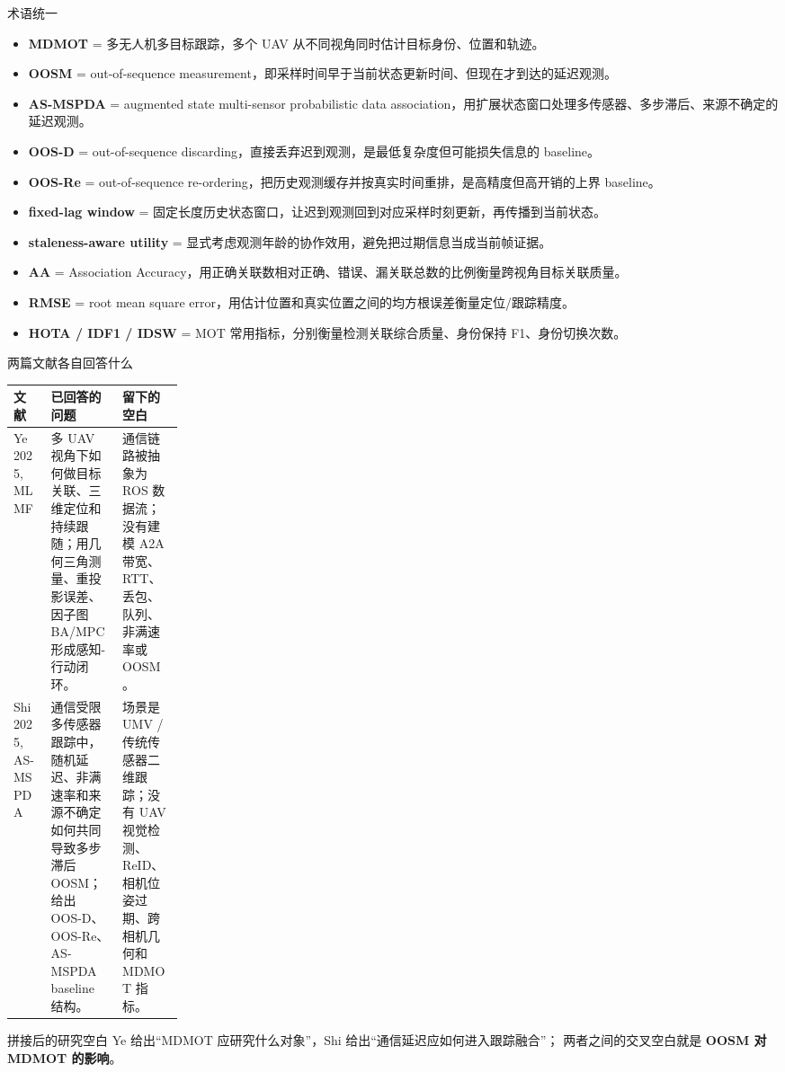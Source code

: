 \documentclass[aspectratio=169,xcolor=dvipsnames]{beamer}
\newcommand{\term}[1]{\textbf{#1}}
\begin{document}
\begin{frame}{术语统一}
\scriptsize
\begin{itemize}\setlength\itemsep{1mm}
  \item \term{MDMOT} = 多无人机多目标跟踪，多个 UAV 从不同视角同时估计目标身份、位置和轨迹。
  \item \term{OOSM} = out-of-sequence measurement，即采样时间早于当前状态更新时间、但现在才到达的延迟观测。
  \item \term{AS-MSPDA} = augmented state multi-sensor probabilistic data association，用扩展状态窗口处理多传感器、多步滞后、来源不确定的延迟观测。
  \item \term{OOS-D} = out-of-sequence discarding，直接丢弃迟到观测，是最低复杂度但可能损失信息的 baseline。
  \item \term{OOS-Re} = out-of-sequence re-ordering，把历史观测缓存并按真实时间重排，是高精度但高开销的上界 baseline。
  \item \term{fixed-lag window} = 固定长度历史状态窗口，让迟到观测回到对应采样时刻更新，再传播到当前状态。
  \item \term{staleness-aware utility} = 显式考虑观测年龄的协作效用，避免把过期信息当成当前帧证据。
  \item \term{AA} = Association Accuracy，用正确关联数相对正确、错误、漏关联总数的比例衡量跨视角目标关联质量。
  \item \term{RMSE} = root mean square error，用估计位置和真实位置之间的均方根误差衡量定位/跟踪精度。
  \item \term{HOTA / IDF1 / IDSW} = MOT 常用指标，分别衡量检测关联综合质量、身份保持 F1、身份切换次数。
\end{itemize}
\end{frame}

\begin{frame}{两篇文献各自回答什么}
\scriptsize
\begin{tabularx}{\linewidth}{p{0.22\linewidth} X X}
\toprule
文献 & 已回答的问题 & 留下的空白 \\
\midrule
Ye 2025, MLMF &
多 UAV 视角下如何做目标关联、三维定位和持续跟随；用几何三角测量、重投影误差、因子图 BA/MPC 形成感知-行动闭环。 &
通信链路被抽象为 ROS 数据流；没有建模 A2A 带宽、RTT、丢包、队列、非满速率或 OOSM。 \\
\addlinespace
Shi 2025, AS-MSPDA &
通信受限多传感器跟踪中，随机延迟、非满速率和来源不确定如何共同导致多步滞后 OOSM；给出 OOS-D、OOS-Re、AS-MSPDA baseline 结构。 &
场景是 UMV / 传统传感器二维跟踪；没有 UAV 视觉检测、ReID、相机位姿过期、跨相机几何和 MDMOT 指标。 \\
\bottomrule
\end{tabularx}

\vspace{2mm}
\begin{block}{拼接后的研究空白}
Ye 给出“MDMOT 应研究什么对象”，Shi 给出“通信延迟应如何进入跟踪融合”；
两者之间的交叉空白就是 \term{OOSM 对 MDMOT 的影响}。
\end{block}
\end{frame}
\end{document}
